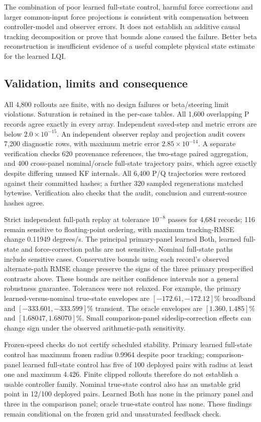 The combination of poor learned full-state control, harmful force corrections
and larger common-input force projections is consistent with compensation
between controller-model and observer errors. It does not establish an additive
causal tracking decomposition or prove that bounds alone caused the failure.
Better beta reconstruction is insufficient evidence of a useful complete
physical state estimate for the learned LQI.

\subsection{Validation, limits and consequence}
All 4,800 rollouts are finite, with no design failures or beta/steering limit
violations. Saturation is retained in the per-case tables. All 1,600 overlapping
P records agree exactly in every array. Independent saved-step and metric
errors are below $2.0\times10^{-15}$. An independent observer replay and
projection audit covers 7,200 diagnostic rows, with maximum metric error
$2.85\times10^{-14}$. A separate verification checks 620 provenance references,
the two-stage paired aggregation, and 400 cross-panel nominal/oracle full-state
trajectory pairs, which agree exactly despite differing unused KF internals.
All 6,400 P/Q trajectories were restored against their committed hashes;
a further 320 sampled regenerations matched bytewise. Verification also checks
that the audit, conclusion and current-source hashes agree.

Strict independent full-path replay at tolerance $10^{-8}$ passes for 4,684
records; 116 remain sensitive to floating-point ordering, with maximum
tracking-RMSE change 0.11949 degrees/s. The principal primary-panel learned
Both, learned full-state and force-correction paths are not sensitive. Nominal
full-state paths include sensitive cases. Conservative bounds using each
record's observed alternate-path RMSE change preserve the signs of the three
primary prespecified contrasts above. These bounds are neither confidence
intervals nor a general robustness guarantee. Tolerances were not relaxed.
For example, the primary learned-versus-nominal true-state envelopes are
$[-172.61,-172.12]\%$ broadband and $[-333.601,-333.599]\%$ transient.
The oracle envelopes are $[1.360,1.485]\%$ and $[1.68047,1.68070]\%$.
Small comparison-panel sideslip-correction effects can change sign under the
observed arithmetic-path sensitivity.

Frozen-speed checks do not certify scheduled stability. Primary learned
full-state control has maximum frozen radius 0.9964 despite poor tracking;
comparison-panel learned full-state control has five of 100 deployed pairs
with radius at least one and maximum 4.426. Finite clipped rollouts therefore
do not establish a usable controller family.
Nominal true-state control also has an unstable grid point in 12/100 deployed
pairs. Learned Both has none in the primary panel and three in the comparison
panel; oracle true-state control has none. These findings remain conditional
on the frozen grid and unsaturated feedback check.

